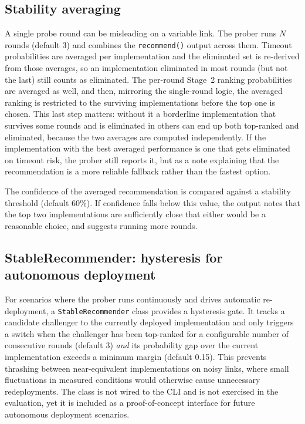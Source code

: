 \subsection{Stability averaging}
\label{subsec:stability}

A single probe round can be misleading on a variable link. The prober runs
$N$ rounds (default 3) and combines the \texttt{recommend()} output across
them. Timeout probabilities are averaged per implementation and the eliminated
set is re-derived from those averages, so an implementation eliminated in most
rounds (but not the last) still counts as eliminated. The per-round Stage~2
ranking probabilities are averaged as well, and then, mirroring the single-round
logic, the averaged ranking is restricted to the surviving implementations
before the top one is chosen. This last step matters: without it a borderline
implementation that survives some rounds and is eliminated in others can end up
both top-ranked and eliminated, because the two averages are computed
independently. If the implementation with the best averaged performance is one
that gets eliminated on timeout risk, the prober still reports it, but as a note
explaining that the recommendation is a more reliable fallback rather than the
fastest option.

The confidence of the averaged recommendation is compared against a
stability threshold (default 60\%). If confidence falls below this value,
the output notes that the top two implementations are sufficiently close
that either would be a reasonable choice, and suggests running more rounds.

\subsection{StableRecommender: hysteresis for autonomous deployment}
\label{subsec:stable-recommender}

For scenarios where the prober runs continuously and drives automatic
re-deployment, a \texttt{Stable\allowbreak Recommender} class provides a hysteresis
gate. It tracks a candidate challenger to the currently deployed
implementation and only triggers a switch when the challenger has been
top-ranked for a configurable number of consecutive rounds (default 3)
\textit{and} its probability gap over the current implementation exceeds
a minimum margin (default 0.15). This prevents thrashing between
near-equivalent implementations on noisy links, where small fluctuations
in measured conditions would otherwise cause unnecessary redeployments.
The class is not wired to the CLI and is not exercised in the evaluation,
yet it is included as a proof-of-concept interface for future autonomous
deployment scenarios.

